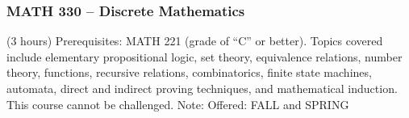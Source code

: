 \subsubsection{MATH 330 -- Discrete Mathematics}
(3 hours) Prerequisites: MATH 221 (grade of “C” or better). Topics covered include elementary propositional logic, set theory, equivalence relations, number theory, functions, recursive relations, combinatorics, finite state machines, automata, direct and indirect proving techniques, and mathematical induction. This course cannot be challenged. Note: Offered: FALL and SPRING